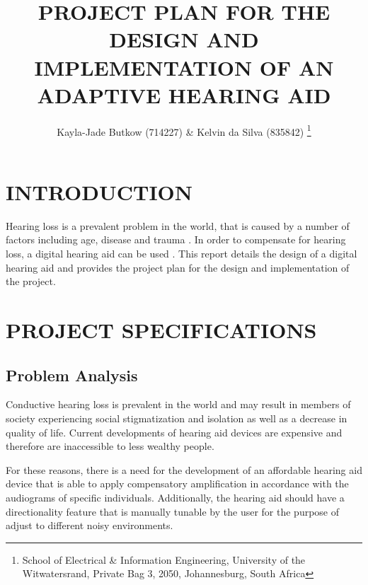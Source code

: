 \documentclass[10pt,twocolumn]{witseiepaper}
\begin{document}
\title{PROJECT PLAN FOR THE DESIGN AND IMPLEMENTATION OF AN ADAPTIVE HEARING AID}

\author{Kayla-Jade Butkow (714227) \& Kelvin da Silva (835842) 
\thanks{School of Electrical \& Information Engineering, University of the
Witwatersrand, Private Bag 3, 2050, Johannesburg, South Africa}
}


%
\abstract{ }


\maketitle
\thispagestyle{empty}
\pagestyle{plain}
\setcounter{page}{1}

%
\section{INTRODUCTION}
Hearing loss is a prevalent problem in the world, that is caused by a number of factors including age, disease and trauma \cite{Evaluation_of_a_hearing_compensation_algorithm}. In order to compensate for hearing loss, a digital hearing aid can be used \cite{Evaluation_of_a_hearing_compensation_algorithm}. This report details the design of a digital hearing aid and provides the project plan for the design and implementation of the project. 

\section{PROJECT SPECIFICATIONS}
\subsection{Problem Analysis}
Conductive hearing loss is prevalent in the world and may result in members of society experiencing social stigmatization and isolation as well as a decrease in quality of life. Current developments of hearing aid devices are expensive and therefore are inaccessible to less wealthy people.

For these reasons, there is a need for the development of an affordable hearing aid device that is able to apply compensatory amplification in accordance with the audiograms of specific individuals. Additionally, the hearing aid should have a directionality feature that is manually tunable by the user for the purpose of adjust to different noisy environments. 
\end{document}
